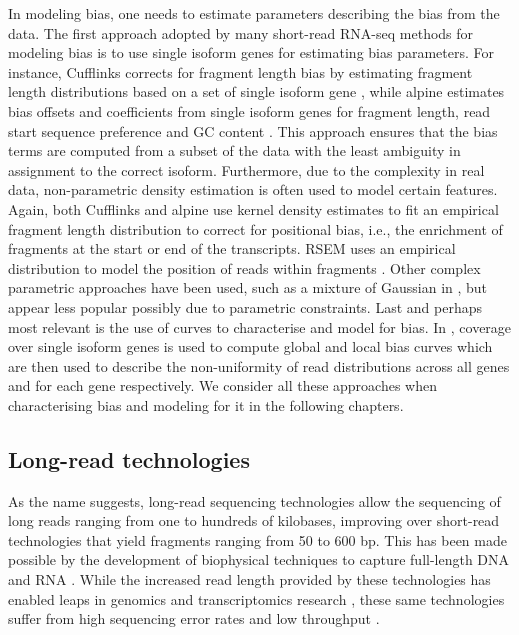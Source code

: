 In modeling bias, one needs to estimate parameters describing the bias from the data. The first approach adopted by many short-read RNA-seq methods for modeling bias is to use single isoform genes for estimating bias parameters. For instance, 
Cufflinks corrects for fragment length bias by estimating fragment length distributions based on a set of single isoform gene \cite{Roberts2011}, while alpine  estimates bias offsets and coefficients from single isoform genes for fragment length, read start sequence preference and GC content \cite{Love2016}. This approach ensures that the bias terms are computed from a subset of the data with the least ambiguity in assignment to the correct isoform. Furthermore, due to the complexity in real data, non-parametric density estimation is often used to model certain features. Again, both Cufflinks and alpine use kernel density estimates to fit an empirical fragment length distribution to correct for positional bias, i.e., the enrichment of fragments at the start or end of the transcripts. RSEM uses an empirical distribution to model the position of reads within fragments \cite{Li2011}. Other complex parametric approaches have been used, such as a mixture of Gaussian in \cite{MIXMIX}, but appear less popular possibly due to parametric constraints. Last and perhaps most relevant is the use of curves to characterise and model for bias. In \cite{NURD}, coverage over single isoform genes is used to compute global and local bias curves which are then used to describe the non-uniformity of read distributions across all genes and for each gene respectively. We consider all these approaches when characterising bias and modeling for it in the following chapters. 

\subsection{Long-read technologies}

As the name suggests, long-read sequencing technologies allow the sequencing of long reads ranging from one to hundreds of kilobases, improving over short-read technologies that yield fragments ranging from 50 to 600 bp. This has been made possible by the development of biophysical techniques to capture full-length DNA and RNA \cite{Weirather2017}. While the increased read length provided by these technologies has enabled leaps in genomics and transcriptomics research \cite{Bolisetty2015, Byrne2017, DeCoster2019, Liu2019, Mantere2019, Nurk2021}, these same technologies suffer from high sequencing error rates and low throughput \cite{Carneiro2012, Reuter2015, Jain2015}.  

